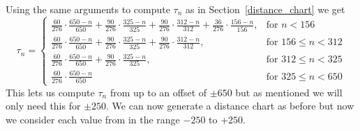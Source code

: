 Using the same arguments to compute $\tau_n$ as in
Section~\ref{distance_chart} we get
\[
  \tau_n =
  \begin{cases}
    \frac{60}{276} \cdot \frac{650 - n}{650} + \frac{90}{276} \cdot
    \frac{325 - n}{325} + \frac{90}{276} \cdot \frac{312 - n}{312}
    + \frac{36}{276} \cdot \frac{156 - n}{156},
    & \text{for } n < 156          \\
    \frac{60}{276} \cdot \frac{650 - n}{650} + \frac{90}{276} \cdot
    \frac{325 - n}{325} + \frac{90}{276} \cdot \frac{312 - n}{312},
    & \text{for } 156 \le  n < 312 \\
    \frac{60}{276} \cdot \frac{650 - n}{650} + \frac{90}{276} \cdot
    \frac{325 - n}{325},
    & \text{for } 312 \le  n < 325 \\
    \frac{60}{276} \cdot \frac{650 - n}{650}
    & \text{for } 325 \le  n < 650
  \end{cases}
\]
This lets us compute $\tau_n$ from up to an offset of $\pm650$ but
as mentioned we will only need this for $\pm250$. We can now
generate a distance chart as before but now we consider each value
from in the range $-250$ to $+250$.
